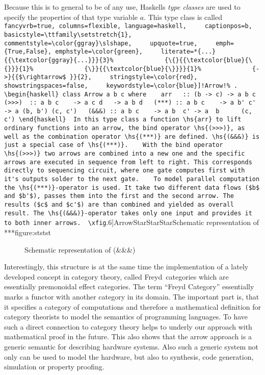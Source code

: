 \documentclass[11pt,final,a4paper]{article}
\newcommand{\hs}[1]{%
  \lstinline[
    fancyvrb=true, columns=flexible, language=haskell,
    captionpos=b,
    basicstyle=\ttfamily\setstretch{1},
    commentstyle=\color{ggray}\slshape,
    upquote=true,
    emph={True,False}, emphstyle=\color{green},
    literate=*{...}{{\textcolor{ggray}{...}}}{3}%
             {\{}{{\textcolor{blue}{\{}}}{1}%
             {\}}{{\textcolor{blue}{\}}}}{1}%
             {->}{{$\rightarrow$ }}{2},
    stringstyle=\color{red}, showstringspaces=false,
    keywordstyle=\color{blue}]!#1!%
}
\newcommand{\xfig}[4][0.9] {%
    \begin{figure}[ht]
        \begin{center}
            \graphicspath{{./}{Images/}}
            \scalebox{#1}{%
                
            }
            \caption{\label{#4} #3}
        \end{center}
    \end{figure}
}
\begin{document}
Because this is to general to be of any use, Haskells \emph{type classes} are used to specify the properties of that type variable $a$. This
type class is called \hs{Arrow}. 

\begin{haskell}
class Arrow a b c where 
  arr   :: (b -> c) -> a b c
  (>>>)  :: a b c    -> a c d   -> a b d
  (***) :: a b c    -> a b' c' -> a (b, b') (c, c')
  (&&&) :: a b c    -> a b  c' -> a  b      (c, c')
\end{haskell}

In this type class a function \hs{arr} to lift ordinary functions into an arrow, the bind operator \hs{(>>>)}, as well as the combination
operator \hs{(***)} are defined. \hs{(&&&)} is just a special case of \hs{(***)}. 


With the bind operator \hs{(>>>)} two arrows are combined into a new one and the specific arrows are executed in sequence from left to
right. This corresponds directly to sequencing circuit, where one gate computes first with it's outputs solder to the next gate. 
 
To model parallel computation the \hs{(***)}-operator is used. It take two different data flows ($b$ and $b'$), passes them into the first
and the second arrow. The results ($c$ and $c'$) are than combined and yielded as overall result. The \hs{(&&&)}-operator takes only one
input and provides it to both inner arrows.

\xfig[.6]{ArrowStarStarStar}{Schematic representation of ***}{figure:ststst}
\xfig[.6]{ArrowAndAndAnd}{Schematic representation of (\&\&\&)}{figure:ananan}


Interestingly, this structure is at the same time the implementation of a lately developed concept in category theory, called Freyd~categories 
which are essentially premonoidal effect categories\cite{Heunen06arrows, Hughes98generalisingmonads,PatersonRA}. The term "`Freyd
Category"' essentially marks a functor with another category in its domain. The important part is, that it specifies a category of
computations and therefore a mathematical definition for category theorists to model the semantics of programming languages. To have such a
direct connection to category theory helps to underly our approach with mathematical proof in the future. This also shows that the arrow
approach is a generic semantic for describing hardware systems. Also such a generic system not only can be used to model the hardware, but
also to synthesis, code generation, simulation or property proofing. 
\end{document}
